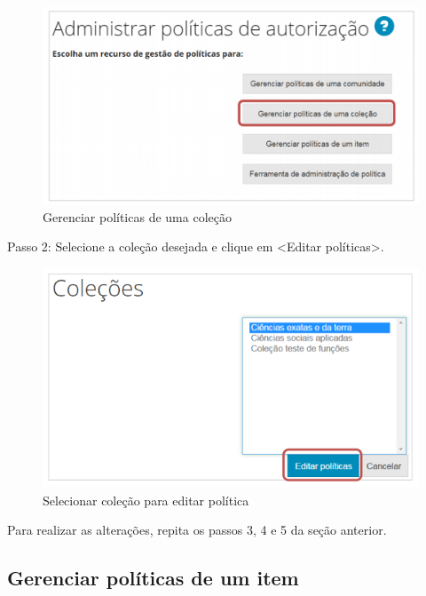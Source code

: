 \documentclass[12pt,hidelinks]{article}
\begin{document}
    \begin{figure}[!htp]
                \centering
                \includegraphics[scale=0.8]{figura/Figura78.png}
                \caption{Gerenciar políticas de uma coleção}
            \label{Rotulo}
        \end{figure}
    
    Passo 2: Selecione a coleção desejada e clique em <Editar políticas>.
    
    \begin{figure}[!htp]
                \centering
                \includegraphics[scale=0.8]{figura/Figura79.png}
                \caption{Selecionar coleção para editar política}
            \label{Rotulo}
        \end{figure}
        
    Para realizar as alterações, repita os passos 3, 4 e 5 da seção anterior.

\newpage

    \subsection{Gerenciar políticas de um item}
    
\end{document}

